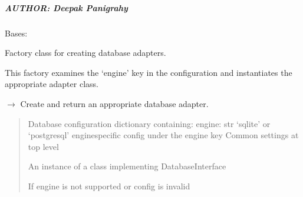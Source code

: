 \documentclass[letterpaper,10pt,english]{sphinxmanual}
\begin{document}
\subparagraph{AUTHOR: Deepak Panigrahy}
\label{\detokenize{core.database.factory:author-deepak-panigrahy}}

\begin{fulllineitems}
\label{\detokenize{core.database.factory:core.database.factory.DatabaseFactory}}
\pysigstartsignatures
\pysigline
{}
\pysigstopsignatures
\sphinxAtStartPar
Bases: 

\sphinxAtStartPar
Factory class for creating database adapters.

\sphinxAtStartPar
This factory examines the ‘engine’ key in the configuration
and instantiates the appropriate adapter class.

\begin{fulllineitems}
\label{\detokenize{core.database.factory:core.database.factory.DatabaseFactory.create}}
\pysigstartsignatures
\pysiglinewithargsret
{}
{}
{{ $\rightarrow$ {\hyperref[\detokenize{core.database.base:core.database.base.DatabaseInterface}]{}}}}
\pysigstopsignatures
\sphinxAtStartPar
Create and return an appropriate database adapter.
\begin{quote}\begin{description}
\sphinxAtStartPar
{} \textendash{} Database configuration dictionary containing:
\sphinxhyphen{} engine: str \sphinxhyphen{} ‘sqlite’ or ‘postgresql’
\sphinxhyphen{} engine\sphinxhyphen{}specific config under the engine key
\sphinxhyphen{} Common settings at top level

\sphinxAtStartPar
An instance of a class implementing DatabaseInterface

\sphinxAtStartPar
{\hyperref[\detokenize{core.database.base:core.database.base.DatabaseError}]{}} \textendash{} If engine is not supported or config is invalid


\end{description}
\end{quote}
\end{fulllineitems}
\end{fulllineitems}
\end{document}
